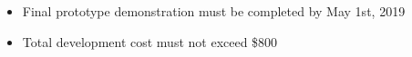 \begin{itemize}
  \item Final prototype demonstration must be completed by May 1st, 2019
  \item Total development cost must not exceed \$800
\end{itemize}
